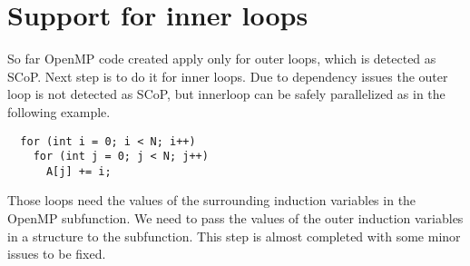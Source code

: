 \documentclass[a4paper,12pt]{book}
\begin{document}
\section{Support for inner loops}
So far OpenMP code created apply only for outer loops, which is detected as SCoP. Next step is to do it for
inner loops. Due to dependency issues the outer loop is not detected as SCoP, but innerloop can be safely
parallelized as in the following example.

{\footnotesize
\begin{lstlisting}
  for (int i = 0; i < N; i++)
    for (int j = 0; j < N; j++)
      A[j] += i;
\end{lstlisting}
}

Those loops need the values of the surrounding induction variables in the OpenMP subfunction. We need
to pass the values of the outer induction variables in a structure to the subfunction. This step is almost
completed with some minor issues to be fixed.
\end{document}
